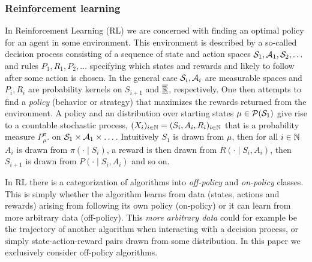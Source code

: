 
\subsubsection{Reinforcement learning}

In Reinforcement Learning (RL) we are concerned with finding an optimal policy
for an agent in some environment.
This environment is described by a so-called decision process
consisting of a sequence of state and action spaces
$\mathcal{S}_1, \mathcal{A}_1, \mathcal{S}_2, \dots$
and rules $P_1, R_1, P_2, \dots$ specifying which states and rewards
and likely to follow after some action is chosen.
In the general case $\mathcal{S}_i, \mathcal{A}_i$ are measurable spaces
and $P_i, R_i$ are probability kernels on $S_{i+1}$ and $\overline{\underline{\mathbb{R}}}$, respectively.
One then attempts to find a \emph{policy} (behavior or strategy) that
maximizes the rewards returned from the environment.
A policy and an distribution over starting states
$\mu \in \mathcal{P}(\mathcal{S}_1)$
give rise to a countable stochastic process,
$ (X_i)_{i\in \mathbb{N}} = (S_i, A_i, R_i)_{i\in \mathbb{N}}$ 
that is a probability measure $P^\pi_\mu$. on
$\mathcal{S}_1 \times \mathcal{A}_1 \times \dots$.
Intuitively $S_1$ is drawn from $\mu$,
then for all $i \in \mathbb{N}$
$A_i$ is drawn from $\pi(\cdot \mid S_i)$,
a reward is then drawn from $R(\cdot \mid S_i, A_i)$,
then $S_{i+1}$ is drawn from $P(\cdot \mid S_i, A_i)$ and so on.


In RL there is a categorization of algorithms into
\emph{off-policy} and \emph{on-policy} classes.
This is simply whether the algorithm learns from data
(states, actions and rewards) arising from 
following its own policy (on-policy) or it can learn from more
arbitrary data (off-policy).
This \emph{more arbitrary data} could for example be
the trajectory of another algorithm when interacting with a decision process,
or simply state-action-reward pairs drawn from some distribution.
In this paper we exclusively consider off-policy algorithms.
